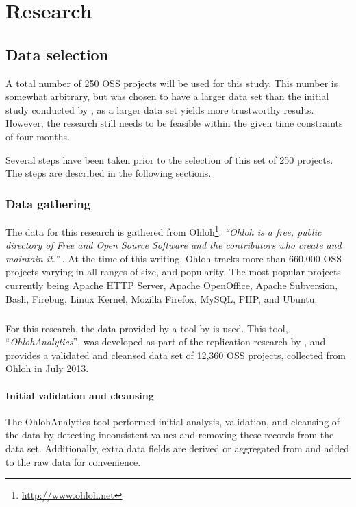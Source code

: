 \chapter{Research}
\label{research}

\section{Data selection}
\label{method:data}
A total number of 250 OSS projects will be used for this study. This number is
somewhat arbitrary, but was chosen to have a larger data set than the initial
study conducted by \citet{karus2013}, as a larger data set yields more
trustworthy results. However, the research still needs to be feasible within
the given time constraints of four months.

Several steps have been taken prior to the selection of this set of 250
projects. The steps are described in the following sections.

\subsection{Data gathering}
The data for this research is gathered from
Ohloh\footnote{\url{http://www.ohloh.net}}: \textit{``Ohloh is a free, public
directory of Free and Open Source Software and the contributors who create and
maintain it.'' } \cite{ohloh}. At the time of this writing, Ohloh tracks more
than 660,000 OSS projects varying in all ranges of size, and popularity. The
most popular projects currently being Apache HTTP Server, Apache OpenOffice,
Apache Subversion, Bash, Firebug, Linux Kernel, Mozilla Firefox, MySQL, PHP,
and Ubuntu.

\paragraph{}
For this research, the data provided by a tool by \citet{ohlohanalytics} is
used. This tool, ``\textit{OhlohAnalytics}'', was developed as part of the
replication research by \citet{bruntink2013}, and provides a validated and
cleansed data set of 12,360 OSS projects, collected from Ohloh in July 2013.

\subsubsection{Initial validation and cleansing}
The OhlohAnalytics tool performed initial analysis, validation, and cleansing
of the data by detecting inconsistent values and removing these records from
the data set. Additionally, extra data fields are derived or aggregated from
and added to the raw data for convenience.

